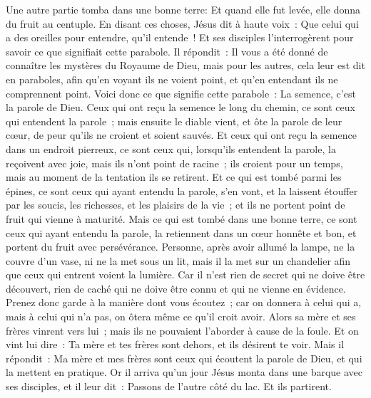 \begin{multicols}{2}
Une autre partie tomba dans une bonne terre: Et quand elle fut levée, elle donna du fruit au centuple. En disant ces choses, Jésus dit à haute voix~: Que celui qui a des oreilles pour entendre, qu'il entende~!
Et ses disciples l'interrogèrent pour savoir ce que signifiait cette parabole.
Il répondit~: Il vous a été donné de connaître les mystères du Royaume de Dieu, mais pour les autres, cela leur est dit en paraboles, afin qu'en voyant ils ne voient point, et qu'en entendant ils ne comprennent point.
Voici donc ce que signifie cette parabole~: La semence, c'est la parole de Dieu.
Ceux qui ont reçu la semence le long du chemin, ce sont ceux qui entendent la parole~; mais ensuite le diable vient, et ôte la parole de leur cœur, de peur qu'ils ne croient et soient sauvés.
Et ceux qui ont reçu la semence dans un endroit pierreux, ce sont ceux qui, lorsqu'ils entendent la parole, la reçoivent avec joie, mais ils n'ont point de racine~; ils croient pour un temps, mais au moment de la tentation ils se retirent.
Et ce qui est tombé parmi les épines, ce sont ceux qui ayant entendu la parole, s'en vont, et la laissent étouffer par les soucis, les richesses, et les plaisirs de la vie~; et ils ne portent point de fruit qui vienne à maturité.
Mais ce qui est tombé dans une bonne terre, ce sont ceux qui ayant entendu la parole, la retiennent dans un cœur honnête et bon, et portent du fruit avec persévérance.
Personne, après avoir allumé la lampe, ne la couvre d'un vase, ni ne la met sous un lit, mais il la met sur un chandelier afin que ceux qui entrent voient la lumière.
Car il n'est rien de secret qui ne doive être découvert, rien de caché qui ne doive être connu et qui ne vienne en évidence.
Prenez donc garde à la manière dont vous écoutez~; car on donnera à celui qui a, mais à celui qui n'a pas, on ôtera même ce qu'il croit avoir.
Alors sa mère et ses frères vinrent vers lui~; mais ils ne pouvaient l'aborder à cause de la foule.
Et on vint lui dire~: Ta mère et tes frères sont dehors, et ils désirent te voir.
Mais il répondit~: Ma mère et mes frères sont ceux qui écoutent la parole de Dieu, et qui la mettent en pratique.
Or il arriva qu'un jour Jésus monta dans une barque avec ses disciples, et il leur dit~: Passons de l'autre côté du lac. Et ils partirent.

\end{multicols}
